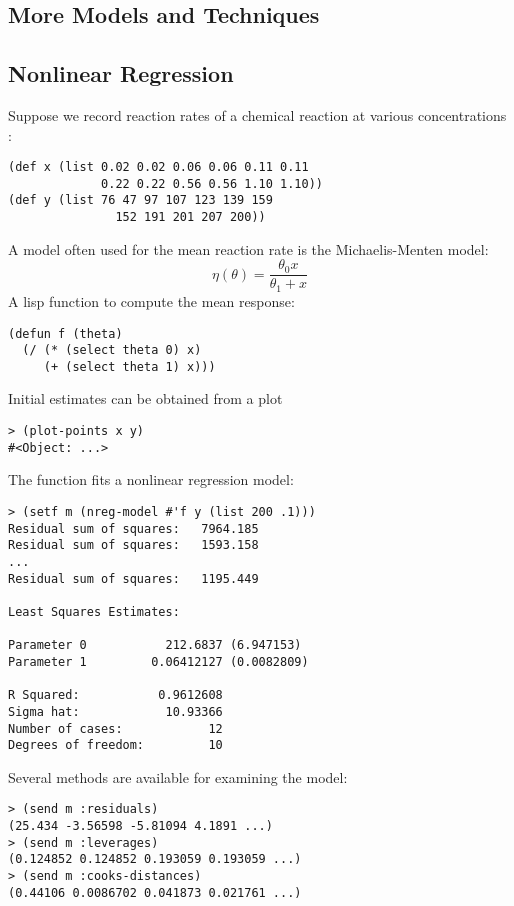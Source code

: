 \begin{slide}{}
\section{More Models and Techniques}
\subsection{Nonlinear Regression}
Suppose we record reaction rates  of a chemical reaction at
various concentrations :
{\Large
\begin{verbatim}
(def x (list 0.02 0.02 0.06 0.06 0.11 0.11
             0.22 0.22 0.56 0.56 1.10 1.10))
(def y (list 76 47 97 107 123 139 159 
               152 191 201 207 200))
\end{verbatim}}
A model often used for the mean reaction rate is the
Michaelis-Menten model:
\begin{displaymath}
\eta(\theta) = \frac{\theta_{0} x}{\theta_{1} + x}
\end{displaymath}
A lisp function to compute the mean response:
{\Large
\begin{verbatim}
(defun f (theta)
  (/ (* (select theta 0) x)
     (+ (select theta 1) x)))
\end{verbatim}}
Initial estimates can be obtained from a plot
{\Large
\begin{verbatim}
> (plot-points x y)
#<Object: ...>
\end{verbatim}}
\end{slide}

\begin{slide}{}
The function  fits a nonlinear regression model:
{\Large
\begin{verbatim}
> (setf m (nreg-model #'f y (list 200 .1)))
Residual sum of squares:   7964.185
Residual sum of squares:   1593.158
...
Residual sum of squares:   1195.449

Least Squares Estimates:

Parameter 0           212.6837 (6.947153)
Parameter 1         0.06412127 (0.0082809)

R Squared:           0.9612608
Sigma hat:            10.93366
Number of cases:            12
Degrees of freedom:         10
\end{verbatim}}
Several methods are available for examining the model:
{\Large
\begin{verbatim}
> (send m :residuals)
(25.434 -3.56598 -5.81094 4.1891 ...)
> (send m :leverages)
(0.124852 0.124852 0.193059 0.193059 ...)
> (send m :cooks-distances)
(0.44106 0.0086702 0.041873 0.021761 ...)
\end{verbatim}}
\end{slide}

